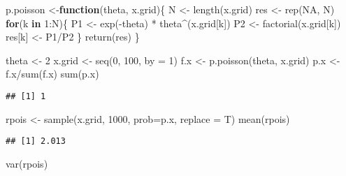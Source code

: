 \documentclass[
  spanish,
]{book}
\newenvironment{Shaded}{\begin{snugshade}}{\end{snugshade}}
\newcommand{\AttributeTok}[1]{\textcolor[rgb]{0.77,0.63,0.00}{#1}}
\newcommand{\ConstantTok}[1]{\textcolor[rgb]{0.00,0.00,0.00}{#1}}
\newcommand{\ControlFlowTok}[1]{\textcolor[rgb]{0.13,0.29,0.53}{\textbf{#1}}}
\newcommand{\DecValTok}[1]{\textcolor[rgb]{0.00,0.00,0.81}{#1}}
\newcommand{\FunctionTok}[1]{\textcolor[rgb]{0.00,0.00,0.00}{#1}}
\newcommand{\NormalTok}[1]{#1}
\newcommand{\OtherTok}[1]{\textcolor[rgb]{0.56,0.35,0.01}{#1}}
\newcommand{\SpecialCharTok}[1]{\textcolor[rgb]{0.00,0.00,0.00}{#1}}
\theoremstyle{definition}
\theoremstyle{definition}
\theoremstyle{definition}
\theoremstyle{definition}
\theoremstyle{remark}
\begin{document}
\begin{Shaded}
\begin{Highlighting}[]
\NormalTok{p.poisson }\OtherTok{\textless{}{-}}\ControlFlowTok{function}\NormalTok{(theta, x.grid)\{}
\NormalTok{  N }\OtherTok{\textless{}{-}} \FunctionTok{length}\NormalTok{(x.grid)}
\NormalTok{  res }\OtherTok{\textless{}{-}} \FunctionTok{rep}\NormalTok{(}\ConstantTok{NA}\NormalTok{, N)}
  \ControlFlowTok{for}\NormalTok{(k }\ControlFlowTok{in} \DecValTok{1}\SpecialCharTok{:}\NormalTok{N)\{}
\NormalTok{    P1 }\OtherTok{\textless{}{-}} \FunctionTok{exp}\NormalTok{(}\SpecialCharTok{{-}}\NormalTok{theta) }\SpecialCharTok{*}\NormalTok{ theta}\SpecialCharTok{\^{}}\NormalTok{(x.grid[k])}
\NormalTok{    P2 }\OtherTok{\textless{}{-}} \FunctionTok{factorial}\NormalTok{(x.grid[k])}
\NormalTok{    res[k] }\OtherTok{\textless{}{-}}\NormalTok{ P1}\SpecialCharTok{/}\NormalTok{P2}
\NormalTok{  \}}
  \FunctionTok{return}\NormalTok{(res)}
\NormalTok{\}}

\NormalTok{theta }\OtherTok{\textless{}{-}} \DecValTok{2}
\NormalTok{x.grid }\OtherTok{\textless{}{-}} \FunctionTok{seq}\NormalTok{(}\DecValTok{0}\NormalTok{, }\DecValTok{100}\NormalTok{, }\AttributeTok{by =} \DecValTok{1}\NormalTok{)}
\NormalTok{f.x }\OtherTok{\textless{}{-}} \FunctionTok{p.poisson}\NormalTok{(theta, x.grid)}
\NormalTok{p.x }\OtherTok{\textless{}{-}}\NormalTok{ f.x}\SpecialCharTok{/}\FunctionTok{sum}\NormalTok{(f.x)}
\FunctionTok{sum}\NormalTok{(p.x)}
\end{Highlighting}
\end{Shaded}

\begin{verbatim}
## [1] 1
\end{verbatim}

\begin{Shaded}
\begin{Highlighting}[]
\NormalTok{rpois }\OtherTok{\textless{}{-}} \FunctionTok{sample}\NormalTok{(x.grid, }\DecValTok{1000}\NormalTok{, }\AttributeTok{prob=}\NormalTok{p.x, }\AttributeTok{replace =}\NormalTok{ T)}
\FunctionTok{mean}\NormalTok{(rpois)}
\end{Highlighting}
\end{Shaded}

\begin{verbatim}
## [1] 2.013
\end{verbatim}

\begin{Shaded}
\begin{Highlighting}[]
\FunctionTok{var}\NormalTok{(rpois)}
\end{Highlighting}
\end{Shaded}
\end{document}
